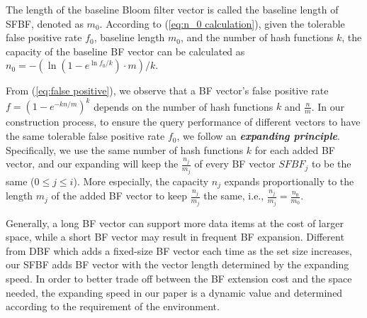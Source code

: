 \documentclass[10pt,journal,letterpaper]{IEEEtran}
\newcommand{\rev}[1]{\uwave{#1}}
\newcommand{\note}[1]{{\sffamily\itshape\bfseries\uline{#1}}}
\begin{document}
The length of the baseline Bloom filter vector is called the baseline length of SFBF, denoted as $m_0$. According to (\ref{eq:n_0 calculation}), given the tolerable false positive rate $f_0$, baseline length $m_0$, and the number of hash functions $k$, the capacity of the baseline BF vector can be calculated as ${n_0} =  - \left( {\ln \left( {1 - {e^{\ln {f_0}/k}}} \right) \cdot m} \right)/k$.

From (\ref{eq:false positive}), we observe that a BF vector's false positive rate $f = {\left( {1 - {e^{ - kn/m}}} \right)^k}$ depends on the number of hash functions $k$ and $\frac{n}{m}$. In our construction process, to ensure the query performance of different vectors to have the same tolerable false positive rate $f_0$, we follow an \emph{\textbf{expanding principle}}. Specifically, we use the same number of hash functions $k$ for each added BF vector, and our expanding will keep the $\frac{{{n_j}}}{{{m_j}}}$ of every BF vector $SFBF_j$ to be the same ($0 \le j \le i$). More especially, the capacity $n_j$ expands proportionally to the length $m_j$ of the added BF vector to keep $\frac{n_j}{m_j}$ the same, i.e., $\frac{{{n_j}}}{{{m_j}}} = \frac{{{n_0}}}{{{m_0}}}$.





Generally, a long BF vector can support more data items at the cost of larger space, while a short BF vector may result in frequent BF expansion. Different from DBF \cite{guo2006theory, wei2010mad2} which adds a fixed-size BF vector each time as the set size increases,  our SFBF adds BF vector with the vector length  determined by the expanding speed. In order to better trade off 
 between the BF extension cost and the space needed, the expanding speed in our paper is a dynamic value and determined according to the requirement of the \rev{real} environment.

\end{document}
